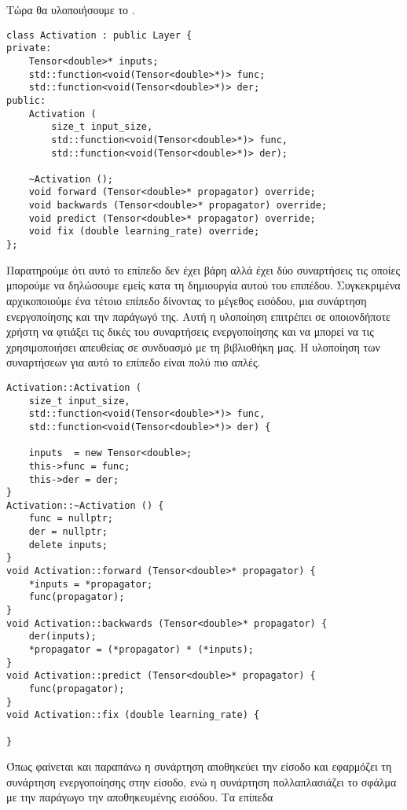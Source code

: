Τώρα θα υλοποιήσουμε το .
\begin{otherlanguage}{english}
\begin{lstlisting}[style=cppstyle,caption= Activation layer in hpp file]
class Activation : public Layer {
private:
    Tensor<double>* inputs;
    std::function<void(Tensor<double>*)> func;
    std::function<void(Tensor<double>*)> der;
public:
    Activation (
        size_t input_size,
        std::function<void(Tensor<double>*)> func,
        std::function<void(Tensor<double>*)> der);

    ~Activation ();
    void forward (Tensor<double>* propagator) override;
    void backwards (Tensor<double>* propagator) override;
    void predict (Tensor<double>* propagator) override;
    void fix (double learning_rate) override;
};
\end{lstlisting}
\end{otherlanguage}
Παρατηρούμε ότι αυτό το επίπεδο δεν έχει βάρη αλλά έχει δύο συναρτήσεις τις οποίες μπορούμε να δηλώσουμε εμείς κατα τη δημιουργία αυτού του επιπέδου. Συγκεκριμένα αρχικοποιούμε ένα τέτοιο επίπεδο δίνοντας το μέγεθος εισόδου, μια συνάρτηση
ενεργοποίησης και την παράγωγό της. Αυτή η υλοποίηση επιτρέπει σε οποιονδήποτε χρήστη να φτιάξει τις δικές του συναρτήσεις ενεργοποίησης και να μπορεί να τις χρησιμοποιήσει απευθείας σε συνδυασμό με τη βιβλιοθήκη μας. Η υλοποίηση των
συναρτήσεων για αυτό το επίπεδο είναι πολύ  πιο απλές.
\begin{otherlanguage}{english}
\begin{lstlisting}[style=cppstyle,caption= Activation layer in cpp file]
Activation::Activation (
    size_t input_size,
    std::function<void(Tensor<double>*)> func,
    std::function<void(Tensor<double>*)> der) {

    inputs  = new Tensor<double>;
    this->func = func;
    this->der = der;
}
Activation::~Activation () {
    func = nullptr;
    der = nullptr;
    delete inputs;
}
void Activation::forward (Tensor<double>* propagator) {
    *inputs = *propagator;
    func(propagator);
}
void Activation::backwards (Tensor<double>* propagator) {
    der(inputs);
    *propagator = (*propagator) * (*inputs);
}
void Activation::predict (Tensor<double>* propagator) {
    func(propagator);
}
void Activation::fix (double learning_rate) {

}
\end{lstlisting}
\end{otherlanguage}
Όπως φαίνεται και παραπάνω η συνάρτηση  αποθηκεύει την είσοδο και εφαρμόζει τη συνάρτηση ενεργοποίησης στην είσοδο, ενώ η συνάρτηση  πολλαπλασιάζει το σφάλμα με την παράγωγο την αποθηκευμένης εισόδου. Τα επίπεδα
